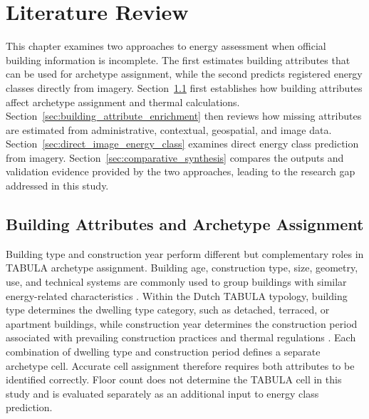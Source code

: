 \chapter{Literature Review}
\label{ch:literature_review}

This chapter examines two approaches to energy assessment when official building information is incomplete. The first estimates building attributes that can be used for archetype assignment, while the second predicts registered energy classes directly from imagery. Section~\ref{sec:building_attributes_archetype_assignment} first establishes how building attributes affect archetype assignment and thermal calculations. Section~\ref{sec:building_attribute_enrichment} then reviews how missing attributes are estimated from administrative, contextual, geospatial, and image data. Section~\ref{sec:direct_image_energy_class} examines direct energy class prediction from imagery. Section~\ref{sec:comparative_synthesis} compares the outputs and validation evidence provided by the two approaches, leading to the research gap addressed in this study.

\section{Building Attributes and Archetype Assignment}
\label{sec:building_attributes_archetype_assignment}

Building type and construction year perform different but complementary roles in TABULA archetype assignment. Building age, construction type, size, geometry, use, and technical systems are commonly used to group buildings with similar energy-related characteristics \parencite{reinhart2016,shen_archetype_2024}. Within the Dutch TABULA typology, building type determines the dwelling type category, such as detached, terraced, or apartment buildings, while construction year determines the construction period associated with prevailing construction practices and thermal regulations \parencite{loga2016,rvo2011}. Each combination of dwelling type and construction period defines a separate archetype cell. Accurate cell assignment therefore requires both attributes to be identified correctly. Floor count does not determine the TABULA cell in this study and is evaluated separately as an additional input to energy class prediction.

